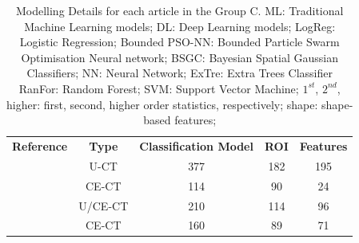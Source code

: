 \documentclass{article}
\begin{document}
\begin{table}[]
    \centering
    \begin{tabular}{ccccc}\toprule
        \multirow{2}{*}{\textbf{Reference}} & \multirow{2}{*}{\textbf{Type}} & \multirow{2}{*}{\textbf{Classification Model}} & \multirow{2}{*}{\textbf{ROI}} & \multirow{2}{*}{\textbf{Features}} \\
        \\ \midrule
        \cite{Bi2017}                & U-CT                                     & 377                                                & 182             & 195             \\
        \cite{Bi2022}                  & CE-CT                                    & 114                                                & 90              & 24              \\
        \cite{Kong2022}                       & U/CE-CT                                  & 210                                                & 114             & 96              \\
        \cite{Zheng2020}                 & CE-CT                                    & 160                                                & 89              & 71              \\
        \bottomrule
    \end{tabular}
    \caption{Modelling Details for each article in the Group C. ML: Traditional Machine Learning models; DL: Deep Learning models; LogReg: Logistic Regression;
        Bounded PSO-NN: Bounded Particle Swarm Optimisation Neural network; BSGC: Bayesian Spatial Gaussian Classifiers; NN: Neural Network; ExTre: Extra Trees Classifier
        RanFor: Random Forest; SVM: Support Vector Machine; $1^{st}$, $2^{nd}$, higher: first, second, higher order statistics, respectively; shape: shape-based features;}
    \label{tab:model_C}
\end{table}
\end{document}
